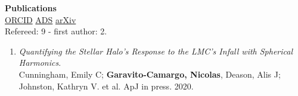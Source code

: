 \documentclass[UTF8]{article}
\begin{document}
{\Large \textbf{Publications}}\\


\indent\indent \href{https://orcid.org/0000-0001-7107-1744}{ORCID}
\href{https://ui.adsabs.harvard.edu/search/q=docs(library%2F0X5_bcuLT4iE-6-Nko0kmg)&sort=date%20desc%2C%20bibcode%20desc&p_=0}{ADS}
\href{https://arxiv.org/search/?query=garavito-camargo&searchtype=all}{arXiv}\\
\indent \indent Refereed: 9 - first author: 2.


\begin{enumerate}

\item \textit{Quantifying the Stellar Halo's Response to the LMC's Infall with
  Spherical Harmonics}.\\
  Cunningham, Emily C; \textbf{Garavito-Camargo, Nicolas}, Deason, Alis J; Johnston, Kathryn V. et al. ApJ in press. 2020.


\end{enumerate}
\end{document}
